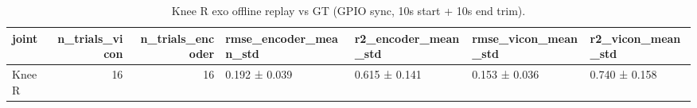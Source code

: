 \begin{table}
\caption{Knee R exo offline replay vs GT (GPIO sync, 10s start + 10s end trim).}
\label{tab:table1_summary}
\begin{tabular}{lrrllll}
\toprule
joint & n\_trials\_vicon & n\_trials\_encoder & rmse\_encoder\_mean\_std & r2\_encoder\_mean\_std & rmse\_vicon\_mean\_std & r2\_vicon\_mean\_std \\
\midrule
Knee R & 16 & 16 & 0.192 ± 0.039 & 0.615 ± 0.141 & 0.153 ± 0.036 & 0.740 ± 0.158 \\
\bottomrule
\end{tabular}
\end{table}
